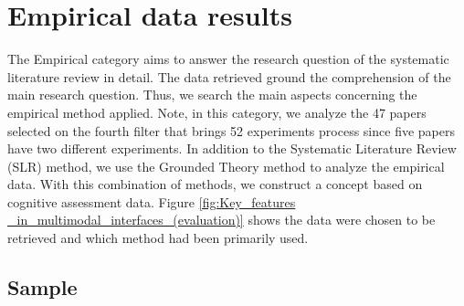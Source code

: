 \section{Empirical data results}
\label{sec:results-empirical}

The Empirical category aims to answer the research question of the systematic literature review in detail. The data retrieved ground the comprehension of the main research question. Thus, we search the main aspects concerning the empirical method applied. Note, in this category, we analyze the 47 papers selected on the fourth filter that brings 52 experiments process since five papers have two different experiments. In addition to the Systematic Literature Review (SLR) method, we use the Grounded Theory method to analyze the empirical data. With this combination of methods, we construct a concept based on cognitive assessment data. Figure \ref{fig:Key_features _in_multimodal_interfaces_(evaluation)} shows the data were chosen to be retrieved and which method had been primarily used.

 	\begin{figure}[h] 
   	    \captionsetup{width=12cm}%
	\end{figure}

\subsection{Sample}
\label{subsec:results-sample}

